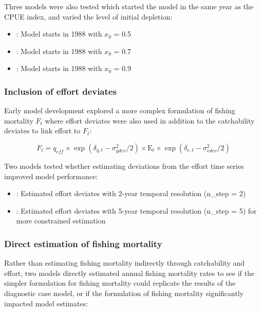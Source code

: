 \documentclass[
  11pt,
]{SCreport}
\providecommand{\tightlist}{%
  \setlength{\itemsep}{0pt}\setlength{\parskip}{0pt}}\usepackage{longtable,booktabs,array}
\begin{document}
Three models were also tested which started the model in the same year
as the CPUE index, and varied the level of initial depletion:

\begin{itemize}
\tightlist
\item
  : Model starts in 1988 with \(x_0\) = 0.5
\item
  : Model starts in 1988 with \(x_0\) = 0.7
\item
  : Model starts in 1988 with \(x_0\) = 0.9
\end{itemize}

\subsubsection{Inclusion of effort deviates}\label{sec-desc-sens-effort}

Early model development explored a more complex formulation of fishing
mortality \(F_t\) where effort deviates were also used in addition to
the catchability deviates to link effort to \(F_t\):

\[F_t = q_{eff} \times \exp(\delta_{q,t} - \sigma_{qdev}^2/2) \times \text{E}_t \times \exp(\delta_{e,t} - \sigma_{edev}^2/2)\]

Two models tested whether estimating deviations from the effort time
series improved model performance:

\begin{itemize}
\tightlist
\item
  : Estimated effort deviates with 2-year temporal
  resolution (n\_step = 2)
\item
  : Estimated effort deviates with 5-year temporal
  resolution (n\_step = 5) for more constrained estimation
\end{itemize}

\subsubsection{Direct estimation of fishing
mortality}\label{sec-desc-sens-direct-f}

Rather than estimating fishing mortality indirectly through catchability
and effort, two models directly estimated annual fishing mortality rates
to see if the simpler formulation for fishing mortality could replicate
the results of the diagnostic case model, or if the formulation of
fishing mortality significantly impacted model estimates:
\end{document}
